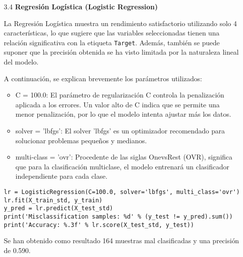 \documentclass{article}
\begin{document}
\begin{itemize}

\item[3.4]  {\bf Regresi\'on Log\'istica (Logistic Regression)}

La Regresi\'on Log\'istica muestra un rendimiento satisfactorio utilizando solo 4 caracter\'isticas, lo que sugiere que las variables seleccionadas tienen una relaci\'on significativa con la etiqueta \texttt{Target}. Adem\'as, tambi\'en se puede suponer que la precisi\'on obtenida se ha visto limitada por la naturaleza lineal del modelo.

A continuaci\'on, se explican brevemente los par\'ametros utilizados:

\begin{itemize}

\item
C = 100.0: El par\'ametro de regularizaci\'on C controla la penalizaci\'on aplicada a los errores. Un valor alto de C indica que se permite una menor penalizaci\'on, por lo que el modelo intenta ajustar m\'as los datos.

\item
solver = 'lbfgs': El solver 'lbfgs' es un optimizador recomendado para solucionar problemas pequeños y medianos.

\item
multi-class = 'ovr': Procedente de las siglas OnevsRest (OVR), significa que para la
clasificaci\'on multiclase, el modelo entrenar\'a un clasificador independiente para cada clase.

\end{itemize}

\begin{tcolorbox}[width=14cm]
\begin{scriptsize}
\begin{verbatim}
lr = LogisticRegression(C=100.0, solver='lbfgs', multi_class='ovr')
lr.fit(X_train_std, y_train)
y_pred = lr.predict(X_test_std)
print('Misclassification samples: %d' % (y_test != y_pred).sum())
print('Accuracy: %.3f' % lr.score(X_test_std, y_test))
\end{verbatim}
\end{scriptsize}
\end{tcolorbox}

Se han obtenido como resultado 164 muestras mal clasificadas y una precisi\'on de 0.590.

\end{itemize}

\bigskip
\end{document}
